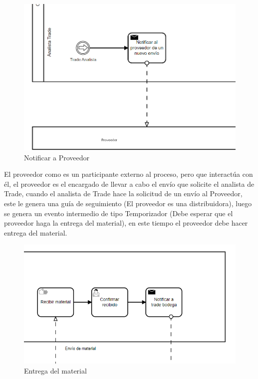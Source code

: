 \begin{figure}[H]
	\centering
	\includegraphics[scale=0.5]{Capitulo4/imagenes/8.png}
	\caption{Notificar a Proveedor}
	\label{SubP2}
\end{figure}

El proveedor como es un participante externo al proceso, pero que interactúa con él, el proveedor es el encargado de llevar a cabo el envío que solicite el analista de Trade, cuando el analista de Trade hace la solicitud de un envío al Proveedor, este le genera una guía de seguimiento (El proveedor es una distribuidora), luego se genera un evento intermedio de tipo Temporizador (Debe esperar que el proveedor haga la entrega del material), en este tiempo el proveedor debe hacer entrega del material.


\begin{figure}[H]
	\centering
	\includegraphics[scale=0.5]{Capitulo4/imagenes/9.png}
	\caption{Entrega del material}
	\label{Entregam}
\end{figure}


